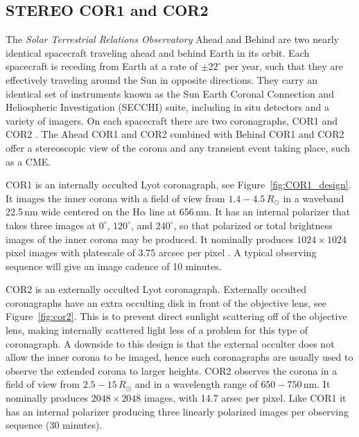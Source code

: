 \subsection{STEREO COR1 and COR2}\label{sec:22}
The \emph{Solar Terrestrial Relations Observatory} \citep[\emph{STEREO};][]{kai08} Ahead and Behind are two nearly identical spacecraft traveling ahead and behind Earth in its orbit. Each spacecraft is receding from Earth at a rate of $\pm22^{\circ}$ per year, such that they are effectively traveling around the Sun in opposite directions. They carry an identical set of instruments known as the Sun Earth Coronal Connection and Heliospheric Investigation (SECCHI) suite, including in situ detectors and a variety of imagers. On each spacecraft there are two coronagraphs, COR1 and COR2 \citep{how08}. The Ahead COR1 and COR2 combined with Behind COR1 and COR2 offer a stereoscopic view of the corona and any transient event taking place, such as a CME.

COR1 is an internally occulted Lyot coronagraph, see Figure~\ref{fig:COR1_design}. It images the inner corona with a field of view from $1.4 - 4.5\,R_{\odot}$ in a waveband 22.5\,nm wide centered on the H$\alpha$ line at 656\,nm. It has an internal polarizer that takes three images at $0^{\circ}$, $120^{\circ}$, and $240^{\circ}$, so that polarized or total brightness images of the inner corona may be produced. It nominally produces $1024\times1024$ pixel images with platescale of 3.75 arcsec per pixel \citep{thomp2008}. A typical observing sequence will give an image cadence of 10 minutes.

COR2 is an externally occulted Lyot coronagraph. Externally occulted coronagraphs have an extra occulting disk in front of the objective lens, see Figure~\ref{fig:cor2}. This is to prevent direct sunlight scattering off of the objective lens, making internally scattered light less of a problem for this type of coronagraph. A downside to this design is that the external occulter does not allow the inner corona to be imaged, hence such coronagraphs are usually used to observe the extended corona to larger heights. COR2 observes the corona in a field of view from $2.5 - 15\,R_{\odot}$ and in a wavelength range of $650 - 750$\,nm. It nominally produces $2048\times2048$ images, with 14.7 arsec per pixel. Like COR1 it has an internal polarizer producing three linearly polarized images per observing sequence (30 minutes).

